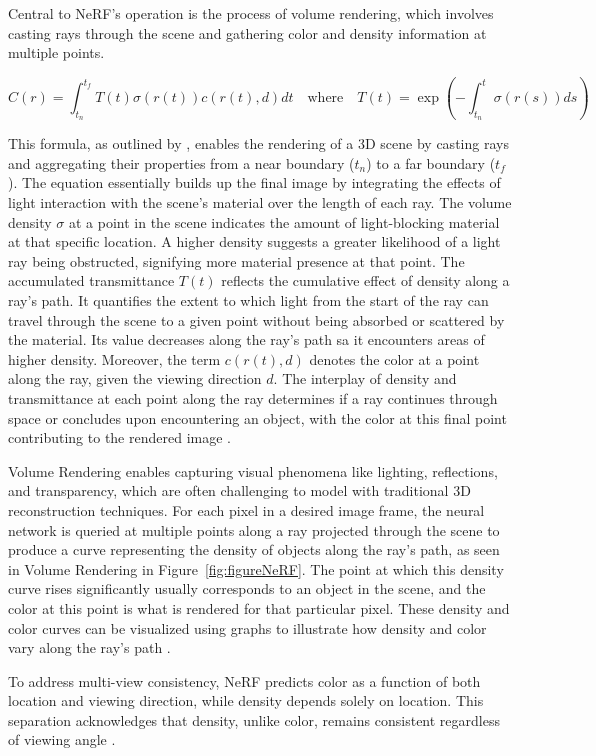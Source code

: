 Central to NeRF's operation is the process of volume rendering, which involves casting rays through the scene and gathering color and density information at multiple points.

\[ 
C(r) = \int_{t_n}^{t_f} T(t)\sigma(r(t))c(r(t), d)dt \quad \text{where} \quad T(t) = \exp\left(-\int_{t_n}^t \sigma(r(s))ds\right) 
\]

This formula, as outlined by \citeauthor{mildenhallNERF}, enables the rendering of a 3D scene by casting rays and aggregating their properties from a near boundary (\(t_n\)) to a far boundary (\(t_f\)). The equation essentially builds up the final image by integrating the effects of light interaction with the scene's material over the length of each ray. The volume density \(\sigma\) at a point in the scene indicates the amount of light-blocking material at that specific location. A higher density suggests a greater likelihood of a light ray being obstructed, signifying more material presence at that point. The accumulated transmittance \( T(t) \) reflects the cumulative effect of density along a ray's path. It quantifies the extent to which light from the start of the ray can travel through the scene to a given point without being absorbed or scattered by the material. Its value decreases along the ray's path sa it encounters areas of higher density. Moreover, the term \( c(r(t), d) \) denotes the color at a point along the ray, given the viewing direction \( d \). The interplay of density and transmittance at each point along the ray determines if a ray continues through space or concludes upon encountering an object, with the color at this final point contributing to the rendered image \citep{mildenhallNERF}. 

Volume Rendering enables capturing visual phenomena like lighting, reflections, and transparency, which are often challenging to model with traditional 3D reconstruction techniques. For each pixel in a desired image frame, the neural network is queried at multiple points along a ray projected through the scene to produce a curve representing the density of objects along the ray's path, as seen in Volume Rendering in Figure~\ref{fig:figureNeRF}. The point at which this density curve rises significantly usually corresponds to an object in the scene, and the color at this point is what is rendered for that particular pixel. These density and color curves can be visualized using graphs to illustrate how density and color vary along the ray's path \citep{mildenhallNERF}.

To address multi-view consistency, NeRF predicts color as a function of both location and viewing direction, while density depends solely on location. This separation acknowledges that density, unlike color, remains consistent regardless of viewing angle \citep{hu2023consistentnerf}. 

